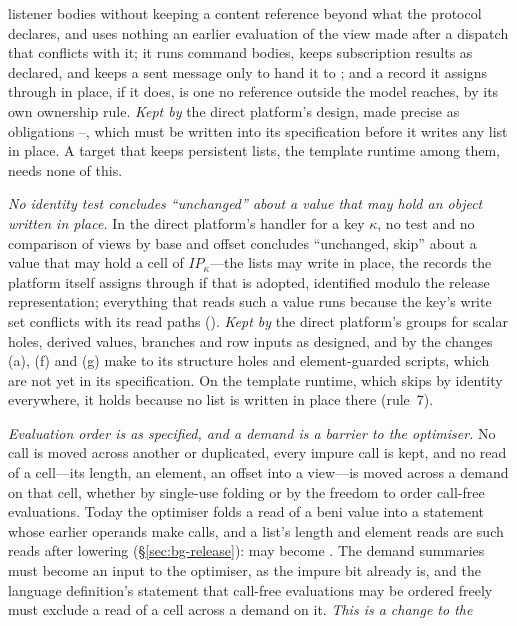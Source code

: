\begin{description}[leftmargin=2.2em,style=sameline,font=\normalfont\bfseries]
listener bodies without keeping a content reference beyond what the protocol declares, and uses nothing
an earlier evaluation of the view made after a dispatch that conflicts with it; it runs command bodies,
keeps subscription results as declared, and keeps a sent message only to hand it to ; and a
record it assigns through in place, if it does, is one no reference outside the model reaches, by its own
ownership rule. \emph{Kept by} the direct platform's design, made precise as
obligations --, which must be written into its specification before it writes any list in
place. A target that keeps persistent lists, the template runtime among them, needs none of this.
\item[A4] \emph{No identity test concludes ``unchanged'' about a value that may hold an object written in
place.} In the direct platform's handler for a key $\kappa$, no \code{===} test and no comparison of views
by base and offset concludes ``unchanged, skip'' about a value that may hold a cell of
$\mathit{IP}_\kappa$---the lists  may write in place, the records the platform itself assigns
through if that is adopted, identified modulo the release representation; everything that reads such a
value runs because the key's write set conflicts with its read paths (). \emph{Kept by} the direct
platform's groups for scalar holes, derived values, branches and row inputs as designed, and by the
changes (a), (f) and (g) make to its structure holes and element-guarded scripts, which are not
yet in its specification. On the template runtime, which skips by identity everywhere, it holds because
no list is written in place there (rule~7).
\item[A5] \emph{Evaluation order is as specified, and a demand is a barrier to the optimiser.} No call
is moved across another or duplicated, every impure call is kept, and no read of a cell---its length,
an element, an offset into a view---is moved across a demand on that cell, whether by single-use
folding or by the freedom to order call-free evaluations. Today the optimiser folds a read of a beni
value into a statement whose earlier operands make calls, and a list's length and element reads are
such reads after lowering (\S\ref{sec:bg-release}): 
may become . The demand summaries must become an input to the optimiser,
as the impure bit already is, and the language definition's statement that call-free evaluations may be
ordered freely must exclude a read of a cell across a demand on it. \emph{This is a change to the
}
\end{description}
